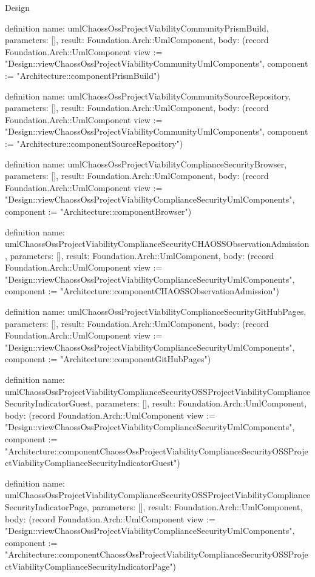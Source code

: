 \begin{lexlean}{Design}
\begin{semanticmodule}
definition{
  name: umlChaossOssProjectViabilityCommunityPrismBuild,
  parameters: [],
  result: Foundation.Arch::UmlComponent,
  body: (record Foundation.Arch::UmlComponent {view := "Design::viewChaossOssProjectViabilityCommunityUmlComponents", component := "Architecture::componentPrismBuild"})
}

definition{
  name: umlChaossOssProjectViabilityCommunitySourceRepository,
  parameters: [],
  result: Foundation.Arch::UmlComponent,
  body: (record Foundation.Arch::UmlComponent {view := "Design::viewChaossOssProjectViabilityCommunityUmlComponents", component := "Architecture::componentSourceRepository"})
}

definition{
  name: umlChaossOssProjectViabilityComplianceSecurityBrowser,
  parameters: [],
  result: Foundation.Arch::UmlComponent,
  body: (record Foundation.Arch::UmlComponent {view := "Design::viewChaossOssProjectViabilityComplianceSecurityUmlComponents", component := "Architecture::componentBrowser"})
}

definition{
  name: umlChaossOssProjectViabilityComplianceSecurityCHAOSSObservationAdmission,
  parameters: [],
  result: Foundation.Arch::UmlComponent,
  body: (record Foundation.Arch::UmlComponent {view := "Design::viewChaossOssProjectViabilityComplianceSecurityUmlComponents", component := "Architecture::componentCHAOSSObservationAdmission"})
}

definition{
  name: umlChaossOssProjectViabilityComplianceSecurityGitHubPages,
  parameters: [],
  result: Foundation.Arch::UmlComponent,
  body: (record Foundation.Arch::UmlComponent {view := "Design::viewChaossOssProjectViabilityComplianceSecurityUmlComponents", component := "Architecture::componentGitHubPages"})
}

definition{
  name: umlChaossOssProjectViabilityComplianceSecurityOSSProjectViabilityComplianceSecurityIndicatorGuest,
  parameters: [],
  result: Foundation.Arch::UmlComponent,
  body: (record Foundation.Arch::UmlComponent {view := "Design::viewChaossOssProjectViabilityComplianceSecurityUmlComponents", component := "Architecture::componentChaossOssProjectViabilityComplianceSecurityOSSProjectViabilityComplianceSecurityIndicatorGuest"})
}

definition{
  name: umlChaossOssProjectViabilityComplianceSecurityOSSProjectViabilityComplianceSecurityIndicatorPage,
  parameters: [],
  result: Foundation.Arch::UmlComponent,
  body: (record Foundation.Arch::UmlComponent {view := "Design::viewChaossOssProjectViabilityComplianceSecurityUmlComponents", component := "Architecture::componentChaossOssProjectViabilityComplianceSecurityOSSProjectViabilityComplianceSecurityIndicatorPage"})
}


\end{semanticmodule}
\end{lexlean}
